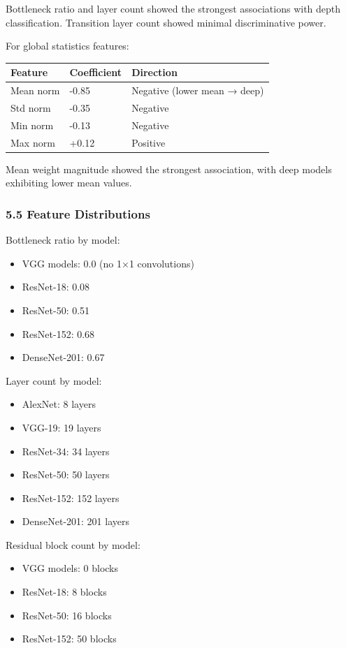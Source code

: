 Bottleneck ratio and layer count showed the strongest associations with depth classification. Transition layer count showed minimal discriminative power.

For global statistics features:

\begin{table}[htbp]
\centering
\begin{tabular}{lll}
\toprule
Feature & Coefficient & Direction \\
\midrule
Mean norm & -0.85 & Negative (lower mean → deep) \\
Std norm & -0.35 & Negative \\
Min norm & -0.13 & Negative \\
Max norm & +0.12 & Positive \\
\bottomrule
\end{tabular}
\end{table}

Mean weight magnitude showed the strongest association, with deep models exhibiting lower mean values.

\subsubsection{5.5 Feature Distributions}

Bottleneck ratio by model:
\begin{itemize}
\item VGG models: 0.0 (no 1×1 convolutions)
\item ResNet-18: 0.08
\item ResNet-50: 0.51
\item ResNet-152: 0.68
\item DenseNet-201: 0.67
\end{itemize}

Layer count by model:
\begin{itemize}
\item AlexNet: 8 layers
\item VGG-19: 19 layers
\item ResNet-34: 34 layers
\item ResNet-50: 50 layers
\item ResNet-152: 152 layers
\item DenseNet-201: 201 layers
\end{itemize}

Residual block count by model:
\begin{itemize}
\item VGG models: 0 blocks
\item ResNet-18: 8 blocks
\item ResNet-50: 16 blocks
\item ResNet-152: 50 blocks
\end{itemize}

